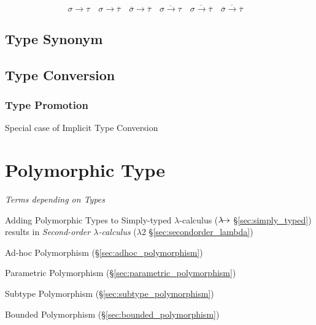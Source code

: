 \[
  \sigma \rightarrow \tau \quad
  \sigma \rightarrow \overline{\tau} \quad
  \overline{\sigma} \rightarrow \overline{\tau} \quad
  \overline{\sigma \rightarrow \tau} \quad
  \overline{\sigma \rightarrow \overline{\tau}} \quad
  \overline{\overline{\sigma} \rightarrow \overline{\tau}} \quad
\]



\subsection{Type Synonym}\label{sec:type_synonym}

\subsection{Type Conversion}\label{sec:type_conversion}

\subsubsection{Type Promotion}\label{sec:type_promotion}

Special case of Implicit Type Conversion



\section{Polymorphic Type}\label{sec:polymorphic_type}

\emph{Terms depending on Types}

Adding Polymorphic Types to Simply-typed $\lambda$-calculus
($\lambda\kern-5pt\rightarrow$ \S\ref{sec:simply_typed}) results in
\emph{Second-order $\lambda$-calculus} ($\lambda2$
\S\ref{sec:secondorder_lambda})


Ad-hoc Polymorphism (\S\ref{sec:adhoc_polymorphism})

Parametric Polymorphism (\S\ref{sec:parametric_polymorphism})

Subtype Polymorphism (\S\ref{sec:subtype_polymorphism})

Bounded Polymorphism (\S\ref{sec:bounded_polymorphism})


